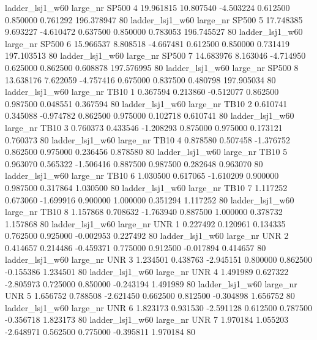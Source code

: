     ladder_lsj1_w60   large_nr    SP500                 4 19.961815 10.807540  -4.503224 0.612500 0.850000  0.761292  196.378947 80
    ladder_lsj1_w60   large_nr    SP500                 5 17.748385  9.693227  -4.610472 0.637500 0.850000  0.783053  196.745527 80
    ladder_lsj1_w60   large_nr    SP500                 6 15.966537  8.808518  -4.667481 0.612500 0.850000  0.731419  197.103513 80
    ladder_lsj1_w60   large_nr    SP500                 7 14.683976  8.163046  -4.714950 0.625000 0.862500  0.608878  197.576995 80
    ladder_lsj1_w60   large_nr    SP500                 8 13.638176  7.622059  -4.757416 0.675000 0.837500  0.480798  197.905034 80
    ladder_lsj1_w60   large_nr     TB10                 1  0.367594  0.213860  -0.512077 0.862500 0.987500  0.048551    0.367594 80
    ladder_lsj1_w60   large_nr     TB10                 2  0.610741  0.345088  -0.974782 0.862500 0.975000  0.102718    0.610741 80
    ladder_lsj1_w60   large_nr     TB10                 3  0.760373  0.433546  -1.208293 0.875000 0.975000  0.173121    0.760373 80
    ladder_lsj1_w60   large_nr     TB10                 4  0.878580  0.507458  -1.376752 0.862500 0.975000  0.236456    0.878580 80
    ladder_lsj1_w60   large_nr     TB10                 5  0.963070  0.565322  -1.506416 0.887500 0.987500  0.282648    0.963070 80
    ladder_lsj1_w60   large_nr     TB10                 6  1.030500  0.617065  -1.610209 0.900000 0.987500  0.317864    1.030500 80
    ladder_lsj1_w60   large_nr     TB10                 7  1.117252  0.673060  -1.699916 0.900000 1.000000  0.351294    1.117252 80
    ladder_lsj1_w60   large_nr     TB10                 8  1.157868  0.708632  -1.763940 0.887500 1.000000  0.378732    1.157868 80
    ladder_lsj1_w60   large_nr      UNR                 1  0.227492  0.120961   0.134335 0.762500 0.925000 -0.002953    0.227492 80
    ladder_lsj1_w60   large_nr      UNR                 2  0.414657  0.214486  -0.459371 0.775000 0.912500 -0.017894    0.414657 80
    ladder_lsj1_w60   large_nr      UNR                 3  1.234501  0.438763  -2.945151 0.800000 0.862500 -0.155386    1.234501 80
    ladder_lsj1_w60   large_nr      UNR                 4  1.491989  0.627322  -2.805973 0.725000 0.850000 -0.243194    1.491989 80
    ladder_lsj1_w60   large_nr      UNR                 5  1.656752  0.788508  -2.621450 0.662500 0.812500 -0.304898    1.656752 80
    ladder_lsj1_w60   large_nr      UNR                 6  1.823173  0.931530  -2.591128 0.612500 0.787500 -0.356718    1.823173 80
    ladder_lsj1_w60   large_nr      UNR                 7  1.970184  1.055203  -2.648971 0.562500 0.775000 -0.395811    1.970184 80
